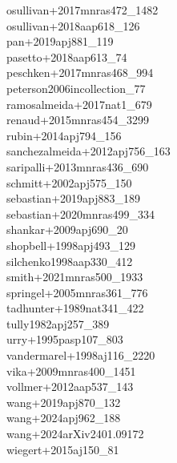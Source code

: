 \documentclass{article}
\begin{document}
\noindent osullivan+2017mnras472_1482 \color{black} \\
\noindent osullivan+2018aap618_126 \color{black} \\
\noindent pan+2019apj881_119 \color{black} \\
\noindent pasetto+2018aap613_74 \color{black} \\
\noindent peschken+2017mnras468_994 \color{black} \\
\noindent peterson2006incollection_77 \color{black} \\
\noindent ramosalmeida+2017nat1_679 \color{black} \\
\noindent renaud+2015mnras454_3299 \color{black} \\
\noindent rubin+2014apj794_156 \color{black} \\
\noindent sanchezalmeida+2012apj756_163 \color{black} \\
\noindent saripalli+2013mnras436_690 \color{black} \\
\noindent schmitt+2002apj575_150 \color{black} \\
\noindent sebastian+2019apj883_189 \color{black} \\
\noindent sebastian+2020mnras499_334 \color{black} \\
\noindent shankar+2009apj690_20 \color{black} \\
\noindent shopbell+1998apj493_129 \color{black} \\
\noindent silchenko1998aap330_412 \color{black} \\
\noindent smith+2021mnras500_1933 \color{black} \\
\noindent springel+2005mnras361_776 \color{black} \\
\noindent tadhunter+1989nat341_422 \color{black} \\
\noindent tully1982apj257_389 \color{black} \\
\noindent urry+1995pasp107_803 \color{black} \\
\noindent vandermarel+1998aj116_2220 \color{black} \\
\noindent vika+2009mnras400_1451 \color{black} \\
\noindent vollmer+2012aap537_143 \color{black} \\
\noindent wang+2019apj870_132 \color{black} \\
\noindent wang+2024apj962_188 \color{black} \\
\noindent wang+2024arXiv2401.09172 \color{black} \\
\noindent wiegert+2015aj150_81 \color{black} \\
\end{document}
